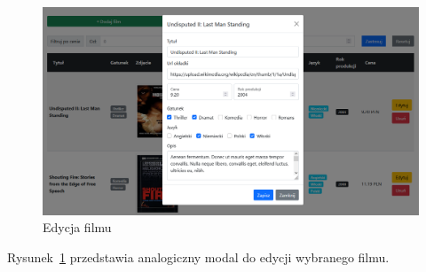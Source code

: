 \documentclass[
    12pt, %
]{fphw}
\begin{document}
    \begin{figure}[H]
        \includegraphics[width=\linewidth]{./assets/3.PNG}
        \caption{Edycja filmu}
        \label{fig:edit}
    \end{figure}

    Rysunek~\ref{fig:edit} przedstawia analogiczny modal do edycji wybranego filmu.

    \newpage
    \listoffigures
    \listoftables
\end{document}
